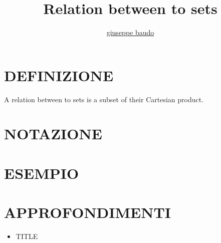 \documentclass[a4paper,10pt]{article}
\title{Relation between to sets}
\author{\href{http://www.baudo.hol.es}{giuseppe baudo}}
\begin{document}
\maketitle

\section{DEFINIZIONE}
A relation between to sets is a subset of their Cartesian product.

\section{NOTAZIONE}

\section{ESEMPIO}

\section{APPROFONDIMENTI}
\begin{itemize}
 \item TITLE
\end{itemize}
\end{document}

